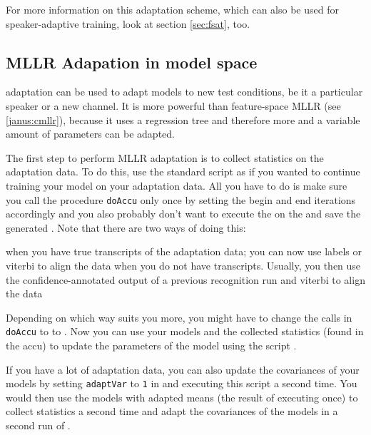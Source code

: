 For more information on this adaptation scheme, which can also be used
for speaker-adaptive training, look at section \ref{sec:fsat}, too.

\subsection{MLLR Adapation in model space} \label{janus:mllr}


  adaptation  can be  used to adapt  models  to  new test
conditions, be it  a particular speaker or  a new channel.  It is more
powerful than feature-space MLLR  (see \ref{janus:cmllr}), because  it
uses a regression tree  and therefore more  and  a variable  amount of
parameters can be adapted.

The first step to perform MLLR adaptation  is to collect statistics on
the  adaptation    data.     To   do  this,      use     the  standard
 script  as if you  wanted to continue training
your model on  your adaptation data. All  you have to  do is make sure
you call the procedure \texttt{doAccu}  only once by setting the begin
and end  iterations accordingly and you   also probably don't  want to
execute   the  on the 
and save the  generated .  Note that there  are
two ways of doing this:

\begin{itemize}
   when you have true transcripts of the adaptation data;
                     you can now use labels or viterbi to align the data
 when you do not have transcripts. Usually, you then use
                     the confidence-annotated output of a previous recognition 
                     run and viterbi to align the data
\end{itemize}

Depending on  which way suits  you more, you might  have to change the
calls  in  \texttt{doAccu}    to         to
.  Now you  can  use your models  and the
collected statistics  (found in the  accu) to update the parameters of
the model using the script .

If you have   a lot  of  adaptation data,  you   can also update   the
covariances of your models  by setting \texttt{adaptVar} to \texttt{1}
in    and executing  this script  a second time.
You  would then   use the models   with  adapted means  (the result of
executing  once)  to collect statistics a second
time and adapt the   covariances of the   models  in a second  run  of
.

